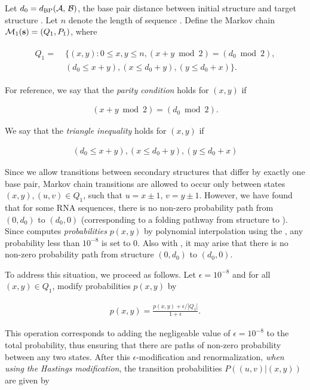 Let $d_0= d_{\text{BP}}(\mathcal A,\,\mathcal B)$, the base pair distance between initial structure
\strA and target structure \strB.  Let $n$ denote the length of sequence \seq.
Define the Markov chain $\mathcal{M}_1({\bf s}) = (Q_1,P_1)$, where

\begin{align}
\label{eq:hermes:markovChainDef}
\begin{split}
Q_1 =\;& \{ (x,y) : 0 \leq x,y \leq n, (x+y \bmod 2)
= (d_0 \bmod 2), \\
& (d_0 \leq x+y), (x \leq d_0 + y), (y \leq d_0 + x) \}.
\end{split}
\end{align}

For reference, we say that the {\em parity condition} holds for
$(x,y)$ if

\begin{align}
\label{eq:hermes:parityCondition} (x+y \bmod 2) = (d_0 \bmod 2).
\end{align}

We say that the {\em triangle inequality} holds for $(x,y)$ if

\begin{align}
\label{eq:hermes:triangleInequality} (d_0 \leq x+y), (x \leq d_0 + y), (y
\leq d_0 + x)
\end{align}

Since we allow transitions between secondary structures that differ by
exactly one base pair, Markov chain transitions are allowed to occur
only between states $(x,y),(u,v) \in Q_1$, such that $u=x\pm 1$, $v =
y \pm 1$. However, we have found that for some RNA sequences, there is
no non-zero probability path from $(0,d_0)$ to $(d_0,0)$
(corresponding to a folding pathway from structure \strA to
\strB). Since \ffttwo computes {\em probabilities} $p(x,y)$ by
polynomial interpolation using the \fft, any
probability less than $10^{-8}$ is set to 0. Also with \rnatwofold,
it may arise that there is no non-zero probability path
from structure $(0,d_0)$ to $(d_0,0)$.

To address this situation, we proceed as follows. Let $\epsilon =
10^{-8}$ and for all $(x,y) \in Q_1$, modify probabilities $p(x,y)$ by

\begin{align}
\label{eq:hermes:mfptNormalize} p(x,y) = \frac{p(x,y) +
\epsilon/|Q_1|}{1+\epsilon }.
\end{align}

This operation corresponds to adding the negligeable value of
$\epsilon=10^{-8}$ to the total probability, thus ensuring that there
are paths of non-zero probability between any two states. After this
$\epsilon$-modification and renormalization, {\em when using the
Hastings modification}, the transition probabilities $P((u,v)|(x,y))$
are given by

